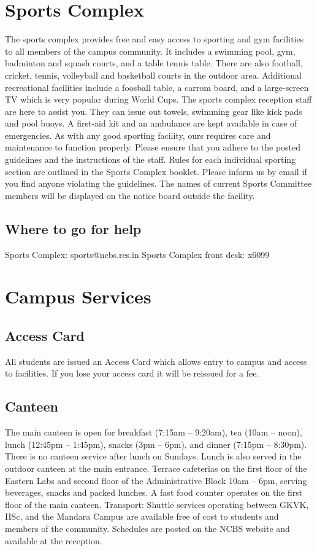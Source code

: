 \documentclass[a4paper,10pt]{article}
\begin{document}
\section{Sports Complex}
The sports complex provides free and easy access to sporting and gym facilities to all
members of the campus community. It includes a swimming pool, gym, badminton and
squash courts, and a table tennis table. There are also football, cricket, tennis, volleyball and
basketball courts in the outdoor area. Additional recreational facilities include a foosball
table, a carrom board, and a large-screen TV which is very popular during World Cups. The
sports complex reception staff are here to assist you. They can issue out towels, swimming
gear like kick pads and pool buoys. A first-aid kit and an ambulance are kept available in
case of emergencies. As with any good sporting facility, ours requires care and maintenance
to function properly. Please ensure that you adhere to the posted guidelines and the
instructions of the staff. Rules for each individual sporting section are outlined in the Sports
Complex booklet. Please inform us by email if you find anyone violating the guidelines. The
names of current Sports Committee members will be displayed on the notice board outside
the facility.

\subsection{Where to go for help}
Sports Complex: sports@ncbs.res.in
Sports Complex front desk: x6099

\section{Campus Services}
\subsection{Access Card}
All students are issued an Access Card which allows entry to campus and
access to facilities. If you lose your access card it will be reissued for a fee.

\subsection{Canteen}
The main canteen is open for breakfast (7:15am – 9:20am), tea (10am – noon),
lunch (12:45pm – 1:45pm), snacks (3pm – 6pm), and dinner (7:15pm – 8:30pm). There is no
canteen service after lunch on Sundays. Lunch is also served in the outdoor canteen at the
main entrance. Terrace cafeterias on the first floor of the Eastern Labs and second floor of
the Administrative Block 10am – 6pm, serving beverages, snacks and packed lunches. A
fast food counter operates on the first floor of the main canteen.
Transport: Shuttle services operating between GKVK, IISc, and the Mandara Campus are
available free of cost to students and members of the community. Schedules are posted on
the NCBS website and available at the reception.
\end{document}
